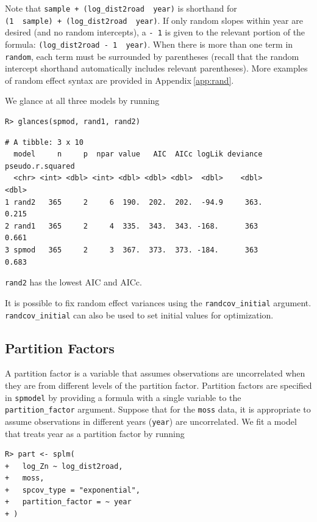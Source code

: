 \documentclass{article}
\begin{document}
Note that \texttt{sample\ +\ (log\_dist2road\ \textbar{}\ year)} is
shorthand for
\texttt{(1\ \textbar{}\ sample)\ +\ (log\_dist2road\ \textbar{}\ year)}.
If only random slopes within year are desired (and no random
intercepts), a \texttt{-\ 1} is given to the relevant portion of the
formula: \texttt{(log\_dist2road\ -\ 1\ \textbar{}\ year)}. When there
is more than one term in \texttt{random}, each term must be surrounded
by parentheses (recall that the random intercept shorthand automatically
includes relevant parentheses). More examples of random effect syntax
are provided in Appendix\(~\)\ref{app:rand}.

We glance at all three models by running

\begin{verbatim}
R> glances(spmod, rand1, rand2)
\end{verbatim}

\begin{verbatim}
# A tibble: 3 x 10
  model     n     p  npar value   AIC  AICc logLik deviance pseudo.r.squared
  <chr> <int> <dbl> <int> <dbl> <dbl> <dbl>  <dbl>    <dbl>            <dbl>
1 rand2   365     2     6  190.  202.  202.  -94.9     363.            0.215
2 rand1   365     2     4  335.  343.  343. -168.      363             0.661
3 spmod   365     2     3  367.  373.  373. -184.      363             0.683
\end{verbatim}

\texttt{rand2} has the lowest AIC and AICc.

It is possible to fix random effect variances using the
\texttt{randcov\_initial} argument. \texttt{randcov\_initial} can also
be used to set initial values for optimization.

\hypertarget{partition-factors}{%
\subsection{Partition Factors}\label{partition-factors}}

A partition factor is a variable that assumes observations are
uncorrelated when they are from different levels of the partition
factor. Partition factors are specified in \texttt{spmodel} by providing
a formula with a single variable to the \texttt{partition\_factor}
argument. Suppose that for the \texttt{moss} data, it is appropriate to
assume observations in different years (\texttt{year}) are uncorrelated.
We fit a model that treats year as a partition factor by running

\begin{verbatim}
R> part <- splm(
+   log_Zn ~ log_dist2road,
+   moss,
+   spcov_type = "exponential",
+   partition_factor = ~ year
+ )
\end{verbatim}
\end{document}
